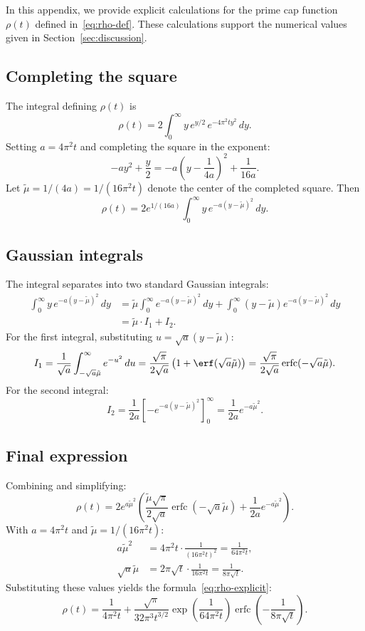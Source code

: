 \documentclass[11pt,a4paper]{article}
\theoremstyle{definition}
\theoremstyle{remark}
\DeclareMathOperator{\erfc}{erfc}
\begin{document}
In this appendix, we provide explicit calculations for the prime cap function $\rho(t)$ defined in~\eqref{eq:rho-def}. These calculations support the numerical values given in Section~\ref{sec:discussion}.

\subsection{Completing the square}

The integral defining $\rho(t)$ is
\[
  \rho(t) = 2 \int_0^{\infty} y \, e^{y/2} \, e^{-4\pi^2 t y^2}\, dy.
\]
Setting $a = 4\pi^2 t$ and completing the square in the exponent:
\[
  -a y^2 + \frac{y}{2} = -a\left( y - \frac{1}{4a} \right)^2 + \frac{1}{16a}.
\]
Let $\tilde{\mu} = 1/(4a) = 1/(16\pi^2 t)$ denote the center of the completed square. Then
\[
  \rho(t) = 2 e^{1/(16a)} \int_0^{\infty} y \, e^{-a(y - \tilde{\mu})^2}\, dy.
\]

\subsection{Gaussian integrals}

The integral separates into two standard Gaussian integrals:
\begin{align*}
  \int_0^{\infty} y \, e^{-a(y - \tilde{\mu})^2}\, dy
  &= \tilde{\mu} \int_0^{\infty} e^{-a(y - \tilde{\mu})^2}\, dy + \int_0^{\infty} (y - \tilde{\mu}) e^{-a(y - \tilde{\mu})^2}\, dy \\
  &= \tilde{\mu} \cdot I_1 + I_2.
\end{align*}
For the first integral, substituting $u = \sqrt{a}(y - \tilde{\mu})$:
\[
  I_1 = \frac{1}{\sqrt{a}} \int_{-\sqrt{a}\tilde{\mu}}^{\infty} e^{-u^2}\, du
      = \frac{\sqrt{\pi}}{2\sqrt{a}} \left( 1 + \erf(\sqrt{a}\tilde{\mu}) \right)
      = \frac{\sqrt{\pi}}{2\sqrt{a}} \erfc(-\sqrt{a}\tilde{\mu}).
\]
For the second integral:
\[
  I_2 = \frac{1}{2a} \left[ -e^{-a(y-\tilde{\mu})^2} \right]_0^{\infty}
      = \frac{1}{2a} e^{-a\tilde{\mu}^2}.
\]

\subsection{Final expression}

Combining and simplifying:
\[
  \rho(t) = 2 e^{a\tilde{\mu}^2} \left( \frac{\tilde{\mu}\sqrt{\pi}}{2\sqrt{a}} \erfc(-\sqrt{a}\tilde{\mu}) + \frac{1}{2a} e^{-a\tilde{\mu}^2} \right).
\]
With $a = 4\pi^2 t$ and $\tilde{\mu} = 1/(16\pi^2 t)$:
\begin{align*}
  a\tilde{\mu}^2 &= 4\pi^2 t \cdot \frac{1}{(16\pi^2 t)^2} = \frac{1}{64\pi^2 t}, \\
  \sqrt{a}\tilde{\mu} &= 2\pi\sqrt{t} \cdot \frac{1}{16\pi^2 t} = \frac{1}{8\pi\sqrt{t}}.
\end{align*}
Substituting these values yields the formula~\eqref{eq:rho-explicit}:
\[
  \rho(t) = \frac{1}{4\pi^2 t} + \frac{\sqrt{\pi}}{32\pi^3 t^{3/2}} \exp\left( \frac{1}{64\pi^2 t} \right) \erfc\left( -\frac{1}{8\pi\sqrt{t}} \right).
\]
\end{document}

